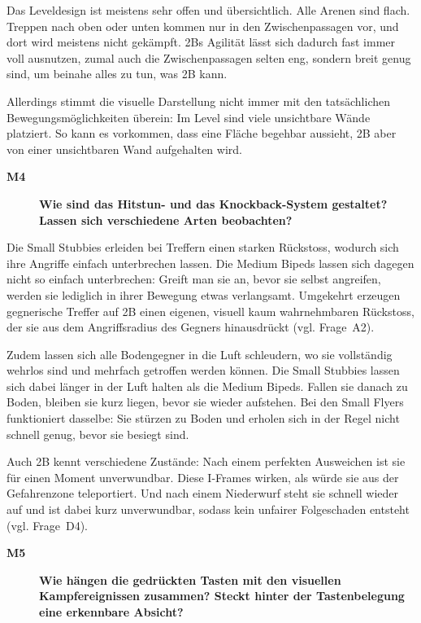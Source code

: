 \documentclass[../Main.tex]{subfiles}
\begin{document}
Das Leveldesign ist meistens sehr offen und übersichtlich. Alle Arenen sind flach. Treppen nach oben oder unten kommen nur in den Zwischenpassagen vor, und dort wird meistens nicht gekämpft. 2Bs Agilität lässt sich dadurch fast immer voll ausnutzen, zumal auch die Zwischenpassagen selten eng, sondern breit genug sind, um beinahe alles zu tun, was 2B kann.

Allerdings stimmt die visuelle Darstellung nicht immer mit den tatsächlichen Bewegungsmöglichkeiten überein: Im Level sind viele unsichtbare Wände platziert. So kann es vorkommen, dass eine Fläche begehbar aussieht, 2B aber von einer unsichtbaren Wand aufgehalten wird.

\begin{description}
    \item[\textbf{M4}] \textbf{Wie sind das Hitstun- und das Knockback-System gestaltet? Lassen sich verschiedene Arten beobachten?}
\end{description}

Die Small Stubbies erleiden bei Treffern einen starken Rückstoss, wodurch sich ihre Angriffe einfach unterbrechen lassen. Die Medium Bipeds lassen sich dagegen nicht so einfach unterbrechen: Greift man sie an, bevor sie selbst angreifen, werden sie lediglich in ihrer Bewegung etwas verlangsamt. Umgekehrt erzeugen gegnerische Treffer auf 2B einen eigenen, visuell kaum wahrnehmbaren Rückstoss, der sie aus dem Angriffsradius des Gegners hinausdrückt (vgl. Frage~A2).

Zudem lassen sich alle Bodengegner in die Luft schleudern, wo sie vollständig wehrlos sind und mehrfach getroffen werden können. Die Small Stubbies lassen sich dabei länger in der Luft halten als die Medium Bipeds. Fallen sie danach zu Boden, bleiben sie kurz liegen, bevor sie wieder aufstehen. Bei den Small Flyers funktioniert dasselbe: Sie stürzen zu Boden und erholen sich in der Regel nicht schnell genug, bevor sie besiegt sind.

Auch 2B kennt verschiedene Zustände: Nach einem perfekten Ausweichen ist sie für einen Moment unverwundbar. Diese I-Frames wirken, als würde sie aus der Gefahrenzone teleportiert. Und nach einem Niederwurf steht sie schnell wieder auf und ist dabei kurz unverwundbar, sodass kein unfairer Folgeschaden entsteht (vgl. Frage~D4).

\begin{description}
    \item[\textbf{M5}] \textbf{Wie hängen die gedrückten Tasten mit den visuellen Kampfereignissen zusammen? Steckt hinter der Tastenbelegung eine erkennbare Absicht?}
\end{description}
\end{document}
